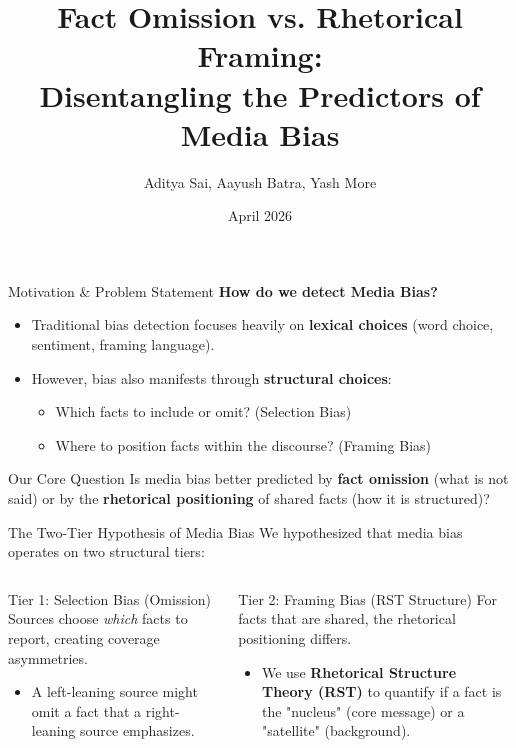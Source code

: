 \documentclass[aspectratio=169, 10pt]{beamer}
\title[Fact Omission vs. Rhetorical Framing]{Fact Omission vs. Rhetorical Framing: \\ Disentangling the Predictors of Media Bias}
\author[Sai, Batra, More]{Aditya Sai, Aayush Batra, Yash More}
\institute[IIIT Hyderabad]{IIIT Hyderabad}
\date{April 2026}
\begin{document}
\begin{frame}
    \titlepage
\end{frame}

\begin{frame}{Motivation \& Problem Statement}
    \textbf{How do we detect Media Bias?}
    \vspace{0.3cm}
    \begin{itemize}
        \item Traditional bias detection focuses heavily on \textbf{lexical choices} (word choice, sentiment, framing language).
        \item However, bias also manifests through \textbf{structural choices}:
        \begin{itemize}
            \item Which facts to include or omit? (Selection Bias)
            \item Where to position facts within the discourse? (Framing Bias)
        \end{itemize}
    \end{itemize}
    
    \vspace{0.4cm}
    \begin{block}{Our Core Question}
    Is media bias better predicted by \textbf{fact omission} (what is not said) or by the \textbf{rhetorical positioning} of shared facts (how it is structured)?
    \end{block}
\end{frame}

\begin{frame}{The Two-Tier Hypothesis of Media Bias}
    We hypothesized that media bias operates on two structural tiers:
    \vspace{0.5cm}
    
    \begin{columns}
        \begin{block}{Tier 1: Selection Bias (Omission)}
        Sources choose \textit{which} facts to report, creating coverage asymmetries.
        \begin{itemize}
            \item A left-leaning source might omit a fact that a right-leaning source emphasizes.
        \end{itemize}
        \end{block}
        
        \begin{block}{Tier 2: Framing Bias (RST Structure)}
        For facts that are shared, the rhetorical positioning differs.
        \begin{itemize}
            \item We use \textbf{Rhetorical Structure Theory (RST)} to quantify if a fact is the "nucleus" (core message) or a "satellite" (background).
        \end{itemize}
        \end{block}
    \end{columns}
\end{frame}
\end{document}
